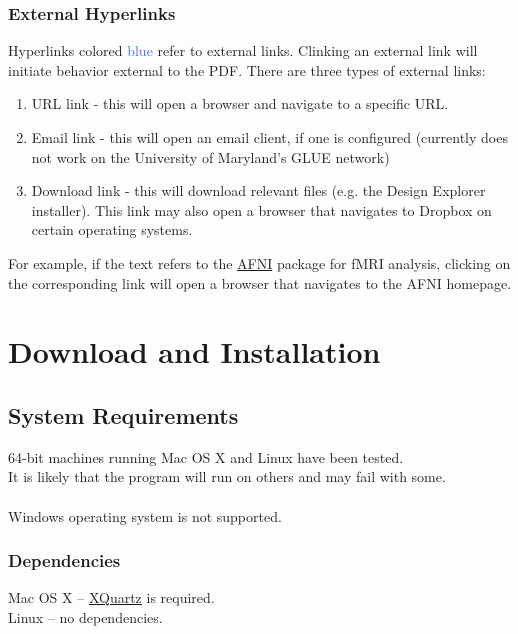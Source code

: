 \documentclass[10pt]{article}
\begin{document}
		\subsubsection*{External Hyperlinks}
		\label{subsubsec:external}
			Hyperlinks colored \textcolor{RoyalBlue}{blue} refer to external links.
			Clinking an external link will initiate behavior external to the PDF.
			There are three types of external links:
			\begin{enumerate}
				\item URL link - this will open a browser and navigate to a specific URL.
				\item Email link - this will open an email client, if one is configured (currently does not work on the University of Maryland's GLUE network)
				\item Download link - this will download relevant files (e.g. the Design Explorer installer).
				This link may also open a browser that navigates to Dropbox on certain operating systems.
			\end{enumerate}
			For example, if the text refers to the \href{https://afni.nimh.nih.gov}{AFNI} package for fMRI analysis, clicking on the corresponding link will open a browser that navigates to the AFNI homepage.
\newpage


\section{Download and Installation}
\label{sec:install}
	\subsection*{System Requirements}
	\label{subsec:reqs}
		64-bit machines running Mac OS X and Linux have been tested. \\
		It is likely that the program will run on others and may fail with some. \\ \\
		Windows operating system is not supported.

		\subsubsection*{Dependencies}
		\label{subsubsec:depend}
			Mac OS X -- \href{https://www.xquartz.org}{XQuartz} is required. \\
			Linux -- no dependencies.
\end{document}
